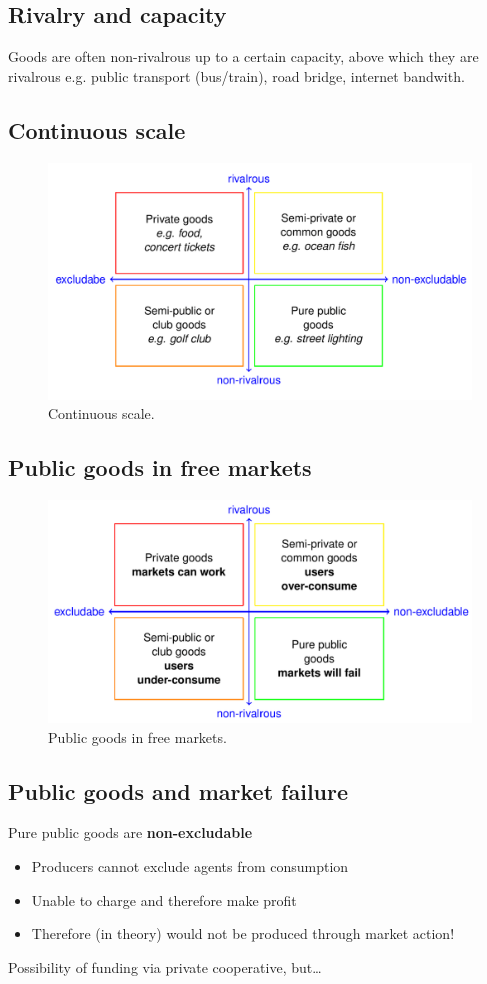 \documentclass[class=report, crop=false, 12pt,a4paper]{standalone}
\begin{document}
\subsection{Rivalry and capacity}
Goods are often non-rivalrous up to a certain capacity, above which they are rivalrous e.g. public transport (bus/train), road bridge, internet bandwith.
\subsection{Continuous scale}
\begin{figure}[H]
	\centering
	\includegraphics[width = \textwidth]{../img/figure14.png}
	\caption{Continuous scale.}
\end{figure}
\subsection{Public goods in free markets}
\begin{figure}[H]
	\centering
	\includegraphics[width = \textwidth]{../img/figure15.png}
	\caption{Public goods in free markets.}
\end{figure}
\subsection{Public goods and market failure}
Pure public goods are \textbf{non-excludable}
\begin{itemize}
	\item Producers cannot exclude agents from consumption
	\item Unable to charge and therefore make profit
	\item Therefore (in theory) would not be produced through market action!
\end{itemize}
Possibility of funding via private cooperative, but\dots
\end{document}
